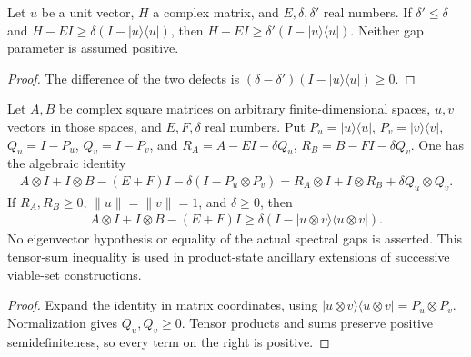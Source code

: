 \begin{theorem}
    \label{thm:projector_gap_mono}
    \leanok
    Let $u$ be a unit vector, $H$ a complex matrix, and $E,\delta,\delta'$
    real numbers. If $\delta'\le\delta$ and
    $H-EI\ge\delta(I-|u\rangle\langle u|)$, then
    $H-EI\ge\delta'(I-|u\rangle\langle u|)$.
    Neither gap parameter is assumed positive.
\end{theorem}
\begin{proof}\leanok
    The difference of the two defects is
    $(\delta-\delta')(I-|u\rangle\langle u|)\ge0$.
\end{proof}

\begin{theorem}
    \label{thm:tensor_sum_lower_gap}
    \leanok
    Let $A,B$ be complex square matrices on arbitrary finite-dimensional
    spaces, $u,v$ vectors in those spaces, and $E,F,\delta$ real numbers.
    Put $P_u=|u\rangle\langle u|$, $P_v=|v\rangle\langle v|$,
    $Q_u=I-P_u$, $Q_v=I-P_v$, and
    $R_A=A-EI-\delta Q_u$, $R_B=B-FI-\delta Q_v$.
    One has the algebraic identity
    \begin{align*}
        A\otimes I+I\otimes B-(E+F)I
            -\delta(I-P_u\otimes P_v)
        =R_A\otimes I+I\otimes R_B+\delta Q_u\otimes Q_v.
    \end{align*}
    If $R_A,R_B\ge0$, $\|u\|=\|v\|=1$, and $\delta\ge0$, then
    \begin{align*}
        A\otimes I+I\otimes B-(E+F)I
            \ge\delta(I-|u\otimes v\rangle\langle u\otimes v|).
    \end{align*}
    No eigenvector hypothesis or equality of the actual spectral gaps is
    asserted. This tensor-sum inequality is used in product-state ancillary
    extensions of successive viable-set constructions.
\end{theorem}
\begin{proof}\leanok
    Expand the identity in matrix coordinates, using
    $|u\otimes v\rangle\langle u\otimes v|=P_u\otimes P_v$.
    Normalization gives $Q_u,Q_v\ge0$. Tensor products and sums preserve
    positive semidefiniteness, so every term on the right is positive.
\end{proof}


